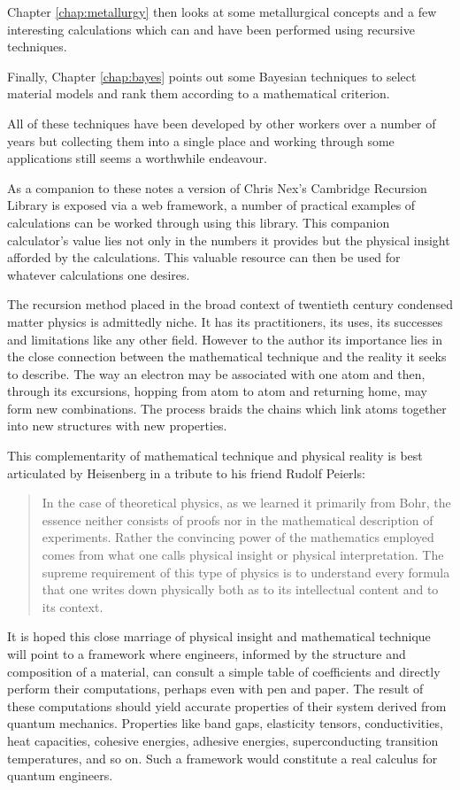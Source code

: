 Chapter \ref{chap:metallurgy} then looks at some metallurgical concepts 
and a few interesting calculations which can and have been performed 
using recursive techniques. 

Finally, Chapter \ref{chap:bayes} points out some Bayesian techniques 
to select material models and rank them according to a mathematical criterion.

All of these techniques have been developed by other workers 
over a number of years but collecting them into a single place 
and working through some applications still seems a worthwhile 
endeavour. 

As a companion to these notes a version of Chris Nex's Cambridge Recursion Library
is exposed via a web framework, a number of practical examples of calculations can
be worked through using this library. This companion calculator's value lies not only
in the numbers it provides but the physical insight afforded by the calculations.
This valuable resource can then be used for whatever calculations one desires.

The recursion method placed in the broad context of twentieth century condensed matter physics
is admittedly niche. It has its practitioners, its uses, 
its successes and limitations like any other field.
However to the author its importance lies in the close connection between the mathematical
technique and the reality it seeks to describe. The way an electron may be associated with 
one atom and then, through its excursions, hopping from atom to atom and returning home,
may form new combinations. The process braids the chains which link atoms together into 
new structures with new properties.

This complementarity of mathematical technique and physical reality 
is best articulated by Heisenberg in a tribute to his friend Rudolf Peierls:
 
\begin{quote}
In the case of theoretical physics, as we learned it primarily from
Bohr, the essence neither consists of proofs
nor in the mathematical description of experiments.
Rather the convincing power of the mathematics employed comes from
what one calls physical insight or physical interpretation. The supreme
requirement of this type of physics is to understand every formula that
one writes down physically both as to its intellectual content and to its context.
\end{quote}
 
It is hoped this close marriage of physical insight and mathematical technique
will point to a framework where engineers, informed by the
structure and composition of a material, can consult a simple table of
coefficients and directly perform their computations, perhaps even with 
pen and paper. The result of these computations should yield accurate 
properties of their system derived from quantum mechanics.
Properties like band gaps, elasticity tensors, conductivities, 
heat capacities, cohesive energies, adhesive energies, superconducting transition temperatures, 
and so on. Such a framework would constitute a real calculus for quantum engineers.
